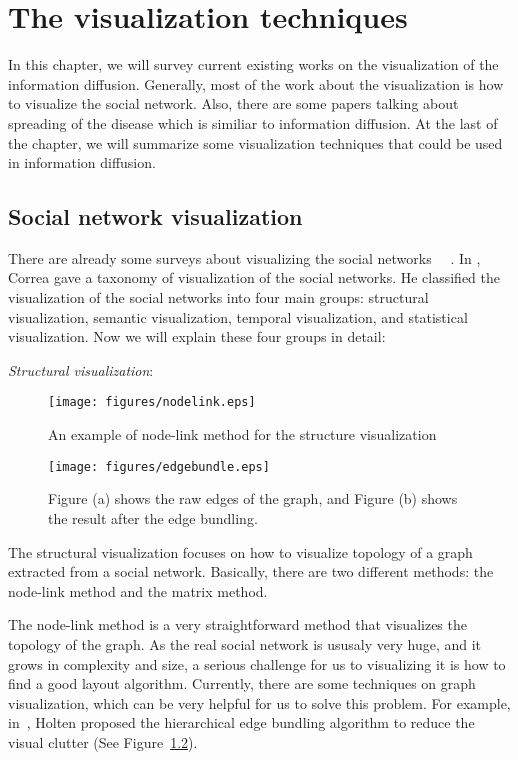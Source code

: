\chapter{The visualization techniques}
\label{chap:visualization}

In this chapter, we will survey current existing works on the
visualization of the information diffusion. Generally, most of
the work about the visualization is how to visualize the social
network. Also, there are some papers talking about spreading of the
disease which is similiar to information diffusion. At the last of the
chapter, we will summarize some visualization techniques that could be
used in information diffusion.

\section{Social network visualization}

There are already some surveys about visualizing the social
networks~\cite{freeman2000visualizing}
~\cite{correa2011visualizing}. 
In \cite{correa2011visualizing}, Correa gave a taxonomy of
visualization of the social networks. He classified the
visualization of the social networks into four main groups: structural
visualization, semantic visualization, temporal visualization, and
statistical visualization. Now we will explain these four groups in
detail:

\textit{Structural visualization}:

\begin{figure}[!htb]
  \centering
  \texttt{[image: figures/nodelink.eps]}
  \caption{An example of node-link method for the structure
    visualization ~\cite{heer2005vizster}}
  \label{fig:nodelink}
\end{figure}

\begin{figure}[!htb]
  \centering
  \texttt{[image: figures/edgebundle.eps]}
  \caption{Figure (a) shows the raw edges of the graph, and Figure (b) shows the result after the edge bundling.}
  \label{fig:edgebundle}
\end{figure}


The structural visualization focuses on how to visualize topology of a
graph extracted from a social network. Basically, there are two
different methods: the node-link method and the matrix method.

The node-link method is a very straightforward method that visualizes the
topology of the graph. As the real social network is ususaly very
huge, and it grows in complexity and size, a serious challenge for us
to visualizing it is how to find a good layout algorithm. Currently,
there are some techniques on graph visualization, which can be very
helpful for us to solve this problem. For example, in~\cite{holten2006hierarchical},
Holten proposed the hierarchical edge bundling algorithm to reduce the visual clutter (See Figure~\ref{fig:edgebundle}).

